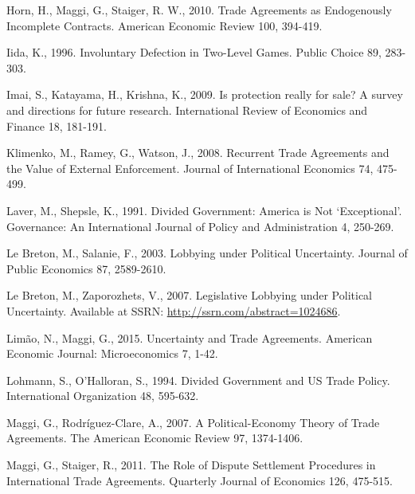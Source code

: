 \documentclass[10pt]{article}
\begin{document}
\begin{list}{}{\setlength{\leftmargin}{0.0in}\setlength{\rightmargin}{0.0in}\setlength{\itemindent}{0.0in}\setlength{\itemsep}{0.1in}}
\item Horn, H., Maggi, G., Staiger, R. W., 2010. Trade Agreements as Endogenously Incomplete Contracts. American Economic Review 100, 394-419.

\item Iida, K., 1996. Involuntary Defection in Two-Level Games. Public Choice 89, 283-303.

\item Imai, S., Katayama, H., Krishna, K., 2009. Is protection really for sale? A survey and directions for future research. International Review of Economics and Finance 18, 181-191.


\item Klimenko, M., Ramey, G., Watson, J., 2008. Recurrent Trade Agreements and the Value of External Enforcement. Journal of International Economics 74, 475-499.


\item Laver, M., Shepsle, K., 1991. Divided Government: America is Not `Exceptional'. Governance: An International Journal of Policy and Administration 4, 250-269.

\item Le Breton, M., Salanie, F., 2003. Lobbying under Political Uncertainty. Journal of Public Economics 87, 2589-2610.

\item Le Breton, M., Zaporozhets, V., 2007. Legislative Lobbying under Political Uncertainty. Available at SSRN: \url{http://ssrn.com/abstract=1024686}.

\item Lim\~{a}o, N., Maggi, G., 2015. Uncertainty and Trade Agreements. American Economic Journal: Microeconomics 7, 1-42.

\item Lohmann, S., O'Halloran, S., 1994. Divided Government and US Trade Policy. International Organization 48, 595-632.

\item Maggi, G., Rodr\'{i}guez-Clare, A., 2007. A Political-Economy Theory of Trade Agreements. The American Economic Review 97, 1374-1406.

\item Maggi, G., Staiger, R., 2011. The Role of Dispute Settlement Procedures in International Trade Agreements. Quarterly Journal of Economics 126, 475-515.


\end{list}
\end{document}
